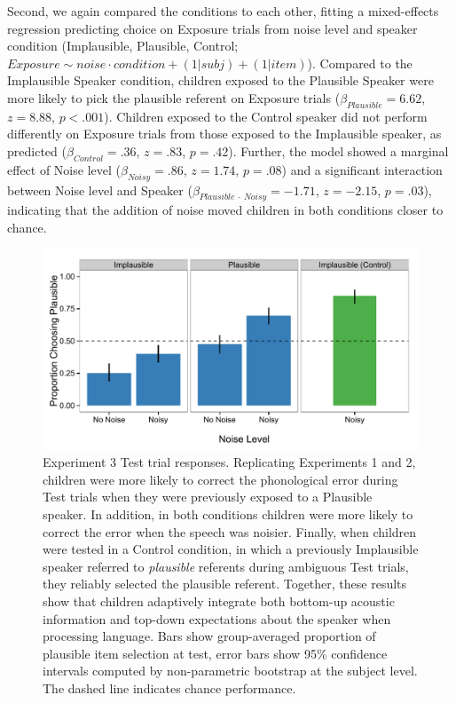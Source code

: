 \documentclass[man,floatsintext]{apa6}
\begin{document}
Second, we again compared the conditions to each other, fitting a mixed-effects regression predicting choice on Exposure trials from noise level and speaker condition (Implausible, Plausible, Control; $Exposure \sim noise \cdot condition + (1|subj) + (1|item)$). Compared to the Implausible Speaker condition, children exposed to the Plausible Speaker were more likely to pick the plausible referent on Exposure trials ($\beta_{Plausible} = 6.62$, $z = 8.88$, $p <.001$). Children exposed to the Control speaker did not perform differently on Exposure trials from those exposed to the Implausible speaker, as predicted ($\beta_{Control} = .36$,  $z = .83$, $p = .42$). Further, the model showed a marginal effect of Noise level ($\beta_{Noisy} = .86$,  $z = 1.74$, $p = .08$) and a significant interaction between Noise level and Speaker ($\beta_{Plausible \: \cdot \: Noisy} = -1.71$, $z= -2.15$, $p = .03$), indicating that the addition of noise moved children in both conditions closer to chance.

\begin{figure}[tb]
     \centering
     \includegraphics[width=5in]{figures/exp3_results.pdf}
    \caption{Experiment 3 Test trial responses. Replicating Experiments 1 and 2, children were more likely to correct the phonological error during Test trials when they were previously exposed to a Plausible speaker. In addition, in both conditions children were more likely to correct the error when the speech was noisier. Finally, when children were tested in a Control condition, in which a previously Implausible speaker referred to \emph{plausible} referents during ambiguous Test trials, they reliably selected the plausible referent. Together, these results show that children adaptively integrate both bottom-up acoustic information and top-down expectations about the speaker when processing language. Bars show group-averaged proportion of plausible item selection at test, error bars show 95\% confidence intervals computed by non-parametric bootstrap at the subject level. The dashed line indicates chance performance.}%
   \label{fig:exp3_results}
\end{figure}
\end{document}
